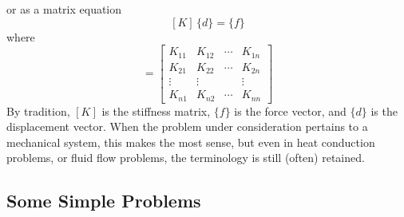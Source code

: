 \documentclass{article}
\begin{document}
or as a matrix equation
\begin{equation}
\left [ K \right ] \, \{d\} = \{f\}
\end{equation}
where
\begin{equation} 
[k] = \left[ 
\begin{array}{cccc}
K_{11} & K_{12} & \cdots & K_{1n} \\ 
K_{21} & K_{22} & \cdots & K_{2n} \\
\vdots & \vdots &        & \vdots \\
K_{n1} & K_{n2} & \cdots & K_{nn} 
\end{array} \right ] \label{Kmatrix} 
\end{equation}
By tradition, $\left [ K \right ]$ is the stiffness matrix, $\{f\}$ is the force
vector, and $\{d\}$ is the displacement vector.  When the problem under
consideration pertains to a mechanical system, this makes the most sense, but
even in heat conduction problems, or fluid flow problems, the terminology
is still (often) retained.

\subsection{Some Simple Problems}
\end{document}

